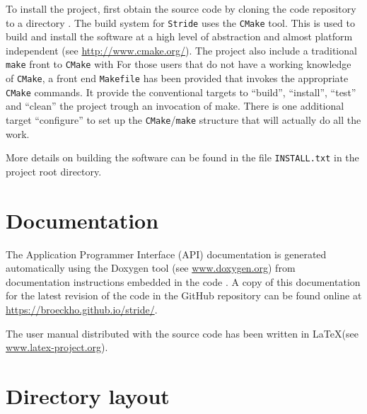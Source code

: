 To install the project, first obtain the source code by cloning the code repository to a directory .
The build system for \texttt{Stride} uses the \texttt{CMake} tool. This is used to build and install the software at a high level of abstraction and almost platform independent (see \url{http://www.cmake.org/}).
The project also include a traditional \texttt{make} front to \texttt{CMake}  with 
For those users that do not have a working knowledge of \texttt{CMake}, a front end \texttt{Makefile} has been provided that invokes the appropriate \texttt{CMake} commands. It provide the conventional targets to ``build'', ``install'', ``test'' and ``clean'' the project trough an invocation of make. There is one additional target ``configure'' to set up the \texttt{CMake}/\texttt{make} structure that will actually do all the work.

More details on building the software can be found in the file \texttt{INSTALL.txt} in the project root directory.


%
\section{Documentation}
\label{section:documentation}

The Application Programmer Interface (API) documentation is generated automatically
using the Doxygen tool (see \url{www.doxygen.org}) from documentation instructions
embedded in the code . A copy of this documentation for the latest revision of the code
in the GitHub repository can be found online at \url{https://broeckho.github.io/stride/}.

The user manual distributed with the source code has been written in \LaTeX (see \url{www.latex-project.org}).



%
\section{Directory layout}


